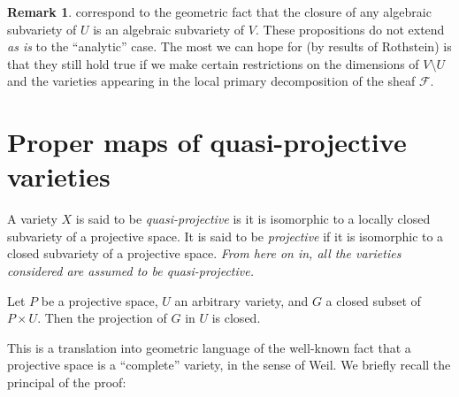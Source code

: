 \documentclass[10pt]{article}
\theoremstyle{plain}
\newenvironment{lemma}[1]
  {\renewcommand\theinnercustomlemma{#1}\innercustomlemma}
  {\endinnercustomlemma}
\theoremstyle{definition}
\newtheorem*{remark}{Remark}
\newcommand{\sh}{\mathscr}
\begin{document}
\begin{remark}
   correspond to the geometric fact that the closure of any algebraic subvariety of $U$ is an algebraic subvariety of $V$.
  These propositions do not extend \emph{as is} to the ``analytic'' case.
  The most we can hope for (by results of Rothstein) is that they still hold true if we make certain restrictions on the dimensions of $V\setminus U$ and the varieties appearing in the local primary decomposition of the sheaf $\sh{F}$.
\end{remark}


\section{Proper maps of quasi-projective varieties}

A variety $X$ is said to be \emph{quasi-projective} is it is isomorphic to a locally closed subvariety of a projective space.
It is said to be \emph{projective} if it is isomorphic to a closed subvariety of a projective space.
\emph{From here on in, all the varieties considered are assumed to be quasi-projective.}

\begin{lemma}{3}
\label{lemma3}
  Let $P$ be a projective space, $U$ an arbitrary variety, and $G$ a closed subset of $P\times U$.
  Then the projection of $G$ in $U$ is closed.
\end{lemma}

This is a translation into geometric language of the well-known fact that a projective space is a ``complete'' variety, in the sense of Weil.
We briefly recall the principal of the proof:
\end{document}
